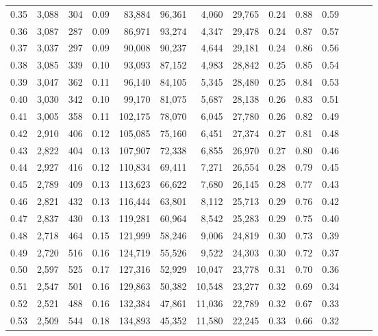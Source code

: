 \begin{tabular}{rrrrrrrrrrrrrr}
0.35 &  3,088 &    304 &  0.09 &   83,884 &   96,361 &   4,060 &  29,765 &  0.24 &  0.88 &      0.59 \\
0.36 &  3,087 &    287 &  0.09 &   86,971 &   93,274 &   4,347 &  29,478 &  0.24 &  0.87 &      0.57 \\
0.37 &  3,037 &    297 &  0.09 &   90,008 &   90,237 &   4,644 &  29,181 &  0.24 &  0.86 &      0.56 \\
0.38 &  3,085 &    339 &  0.10 &   93,093 &   87,152 &   4,983 &  28,842 &  0.25 &  0.85 &      0.54 \\
0.39 &  3,047 &    362 &  0.11 &   96,140 &   84,105 &   5,345 &  28,480 &  0.25 &  0.84 &      0.53 \\
0.40 &  3,030 &    342 &  0.10 &   99,170 &   81,075 &   5,687 &  28,138 &  0.26 &  0.83 &      0.51 \\
0.41 &  3,005 &    358 &  0.11 &  102,175 &   78,070 &   6,045 &  27,780 &  0.26 &  0.82 &      0.49 \\
0.42 &  2,910 &    406 &  0.12 &  105,085 &   75,160 &   6,451 &  27,374 &  0.27 &  0.81 &      0.48 \\
0.43 &  2,822 &    404 &  0.13 &  107,907 &   72,338 &   6,855 &  26,970 &  0.27 &  0.80 &      0.46 \\
0.44 &  2,927 &    416 &  0.12 &  110,834 &   69,411 &   7,271 &  26,554 &  0.28 &  0.79 &      0.45 \\
0.45 &  2,789 &    409 &  0.13 &  113,623 &   66,622 &   7,680 &  26,145 &  0.28 &  0.77 &      0.43 \\
0.46 &  2,821 &    432 &  0.13 &  116,444 &   63,801 &   8,112 &  25,713 &  0.29 &  0.76 &      0.42 \\
0.47 &  2,837 &    430 &  0.13 &  119,281 &   60,964 &   8,542 &  25,283 &  0.29 &  0.75 &      0.40 \\
0.48 &  2,718 &    464 &  0.15 &  121,999 &   58,246 &   9,006 &  24,819 &  0.30 &  0.73 &      0.39 \\
0.49 &  2,720 &    516 &  0.16 &  124,719 &   55,526 &   9,522 &  24,303 &  0.30 &  0.72 &      0.37 \\
0.50 &  2,597 &    525 &  0.17 &  127,316 &   52,929 &  10,047 &  23,778 &  0.31 &  0.70 &      0.36 \\
0.51 &  2,547 &    501 &  0.16 &  129,863 &   50,382 &  10,548 &  23,277 &  0.32 &  0.69 &      0.34 \\
0.52 &  2,521 &    488 &  0.16 &  132,384 &   47,861 &  11,036 &  22,789 &  0.32 &  0.67 &      0.33 \\
0.53 &  2,509 &    544 &  0.18 &  134,893 &   45,352 &  11,580 &  22,245 &  0.33 &  0.66 &      0.32 \\

\end{tabular}
